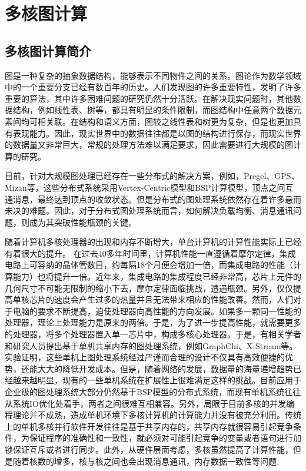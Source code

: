 
\chapter{多核图计算}

\section{多核图计算简介}

图是一种复杂的抽象数据结构，能够表示不同物件之间的关系。图论作为数学领域中的一个重要分支已经有数百年的历史。人们发现图的许多重要特性，发明了许多重要的算法，其中许多困难问题的研究仍然十分活跃。在解决现实问题时，其他数据结构，例如线性表、树等，都具有明显的条件限制，而图结构中任意两个数据元素间均可相关联。在结构和语义方面，图较之线性表和树更为复杂，但是也更加具有表现能力。因此，现实世界中的数据往往都是以图的结构进行保存，而现实世界的数据量又非常巨大，常规的处理方法难以满足要求，因此需要进行大规模的图计算的研究。

目前，针对大规模图处理已经存在一些分布式的解决方案，例如，Pregel、GPS、Mizan等，这些分布式系统采用Vertex-Centric模型和BSP计算模型，顶点之间互通消息，最终达到顶点的收敛状态。但是分布式的图处理系统依然存在着许多悬而未决的难题。因此，对于分布式图处理系统而言，如何解决负载均衡、消息通讯问题，则成为其突破性能瓶颈的关键。

随着计算机多核处理器的出现和内存不断增大，单台计算机的计算性能实际上已经有着很大的提升。
在过去40多年时间里，计算机性能一直遵循着摩尔定律，集成电路上可容纳的晶体管数目，约每隔18个月便会增加一倍，而集成电路的性能（计算能力）也将提升一倍。近年来，集成电路的集成程度已经非常高，芯片上元件的几何尺寸不可能无限制的缩小下去，摩尔定律面临挑战，遭遇瓶颈。另外，仅仅提高单核芯片的速度会产生过多的热量并且无法带来相应的性能改善。然而，人们对于电脑的要求不断提高，迫使处理器向高性能的方向发展。如果多一颗同一性能的处理器，理论上处理能力是原来的两倍。于是，为了进一步提高性能，就需要更多的处理器，将多个处理器置入单一芯片中，构成多核心处理器。于是，有相关学者和研究人员提出基于单机共享内存的图处理系统，例如GraphChi、X-Stream等。实验证明，这些单机上图处理系统经过严谨而合理的设计不仅具有高效便捷的优势，还能大大的降低开发成本。但是，随着网络的发展，数据量的海量递增趋势已经越来越明显，现有的一些单机系统在扩展性上很难满足这样的挑战。目前应用于企业级的图处理系统大部分仍然基于BSP模型的分布式系统，而现有单机系统往往从系统IO优化处着手，两者之间很难互相兼容。另外，局限于目前多核的并发编程理论并不成熟，造成单机环境下多核计算机的计算能力并没有被充分利用。传统上的单机多核并行软件开发往往是基于共享内存的，共享内存就很容易引起竞争条件，为保证程序的准确性和一致性，就必须对可能引起竞争的变量或者语句进行加锁保证互斥或者进行同步。此外，从硬件层面考虑，多核虽然提高了计算性能，但是随着核数的增多，核与核之间也会出现消息通讯，内存数据一致性等问题.


